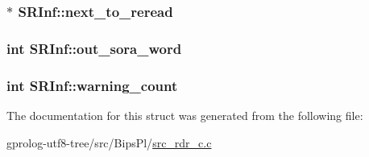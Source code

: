 \subsubsection[{\texorpdfstring{next\+\_\+to\+\_\+reread}{next_to_reread}}]{$\ast$ S\+R\+Inf\+::next\+\_\+to\+\_\+reread}\hypertarget{structSRInf_afa0401eba053150cf9e719858d47f22b}{}\label{structSRInf_afa0401eba053150cf9e719858d47f22b}
\subsubsection[{\texorpdfstring{out\+\_\+sora\+\_\+word}{out_sora_word}}]{\setlength{\rightskip}{0pt plus 5cm}int S\+R\+Inf\+::out\+\_\+sora\+\_\+word}\hypertarget{structSRInf_af83f16042ade6e52ac4859f203ef0db4}{}\label{structSRInf_af83f16042ade6e52ac4859f203ef0db4}
\subsubsection[{\texorpdfstring{warning\+\_\+count}{warning_count}}]{\setlength{\rightskip}{0pt plus 5cm}int S\+R\+Inf\+::warning\+\_\+count}\hypertarget{structSRInf_a432e213e2296877a22dd6e174cb65586}{}\label{structSRInf_a432e213e2296877a22dd6e174cb65586}


The documentation for this struct was generated from the following file\+:\begin{DoxyCompactItemize}
\item 
gprolog-\/utf8-\/tree/src/\+Bips\+Pl/\hyperlink{src__rdr__c_8c}{src\+\_\+rdr\+\_\+c.\+c}\end{DoxyCompactItemize}
